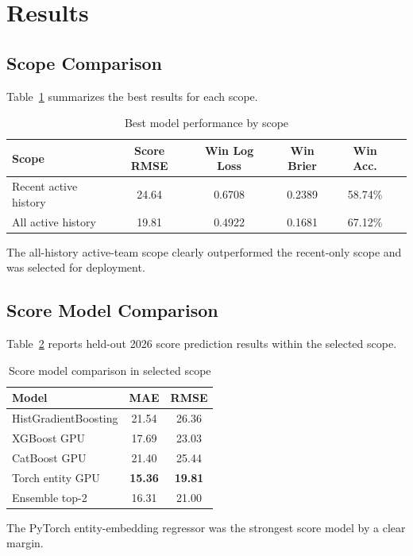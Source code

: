\documentclass[conference]{IEEEtran}
\begin{document}
\section{Results}
\subsection{Scope Comparison}
Table~\ref{tab:scope} summarizes the best results for each scope.

\begin{table}[!t]
\caption{Best model performance by scope}
\label{tab:scope}
\centering
\begin{tabular}{>{\raggedright\arraybackslash}p{2.55cm}ccccc}
\toprule
Scope & Score RMSE & Win Log Loss & Win Brier & Win Acc. \\
\midrule
Recent active history & 24.64 & 0.6708 & 0.2389 & 58.74\% \\
All active history & 19.81 & 0.4922 & 0.1681 & 67.12\% \\
\bottomrule
\end{tabular}
\end{table}

The all-history active-team scope clearly outperformed the recent-only scope and was selected for deployment.

\subsection{Score Model Comparison}
Table~\ref{tab:score} reports held-out 2026 score prediction results within the selected scope.

\begin{table}[!t]
\caption{Score model comparison in selected scope}
\label{tab:score}
\centering
\begin{tabular}{lcc}
\toprule
Model & MAE & RMSE \\
\midrule
HistGradientBoosting & 21.54 & 26.36 \\
XGBoost GPU & 17.69 & 23.03 \\
CatBoost GPU & 21.40 & 25.44 \\
Torch entity GPU & \textbf{15.36} & \textbf{19.81} \\
Ensemble top-2 & 16.31 & 21.00 \\
\bottomrule
\end{tabular}
\end{table}

The PyTorch entity-embedding regressor was the strongest score model by a clear margin.
\end{document}
